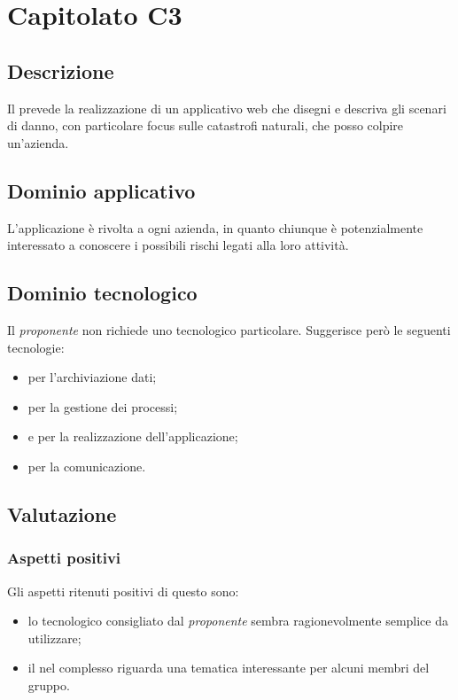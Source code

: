 \documentclass[../StudioDiFattibilita.tex]{subfiles}
\begin{document}
	\section{Capitolato C3}
		\subsection{Descrizione}
			Il  prevede la realizzazione di un applicativo web che disegni e descriva gli scenari di danno, con particolare focus sulle catastrofi naturali, che posso colpire un'azienda.
		\subsection{Dominio applicativo}
			L'applicazione è rivolta a ogni azienda, in quanto chiunque è potenzialmente interessato a conoscere i possibili rischi legati alla loro attività.
		\subsection{Dominio tecnologico} %
			Il \textit{proponente} non richiede uno  tecnologico particolare. Suggerisce però le seguenti tecnologie:
			\begin{itemize}
				\item \textbf{} per l'archiviazione dati;
				\item \textbf{} per la gestione dei processi;
				\item \textbf{} e \textbf{} per la realizzazione dell'applicazione;
				\item \textbf{} per la comunicazione.
			\end{itemize}
		\subsection{Valutazione}
			\subsubsection{Aspetti positivi}
				Gli aspetti ritenuti positivi di questo  sono:
				\begin{itemize}
					\item lo  tecnologico consigliato dal \textit{proponente} sembra ragionevolmente semplice da utilizzare;
					\item il  nel complesso riguarda una tematica interessante per alcuni membri del gruppo.
				\end{itemize}					
\end{document}
